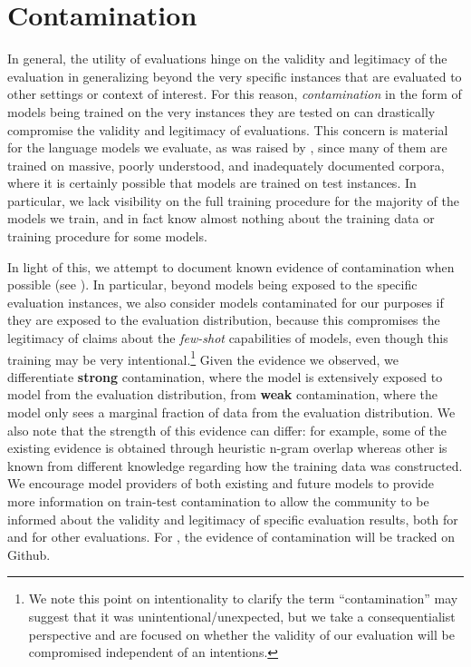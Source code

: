 \hypertarget{contamination}{\section{Contamination}}
\label{app:contamination}

In general, the utility of evaluations hinge on the validity and legitimacy of the evaluation in generalizing beyond the very specific instances that are evaluated to other settings or context of interest.
For this reason, \textit{contamination} in the form of models being trained on the very instances they are tested on can drastically compromise the validity and legitimacy of evaluations.
This concern is material for the language models we evaluate, as was raised by \citet{brown2020gpt3}, since many of them are trained on massive, poorly understood, and inadequately documented corpora, where it is certainly possible that models are trained on test instances.
In particular, we lack visibility on the full training procedure for the majority of the models we train, and in fact know almost nothing about the training data or training procedure for some models.


In light of this, we attempt to document known evidence of contamination when possible (see ).
In particular, beyond models being exposed to the specific evaluation instances, we also consider models contaminated for our purposes if they are exposed to the evaluation distribution, because this compromises the legitimacy of claims about the \textit{few-shot} capabilities of models, even though this training may be very intentional.\footnote{We note this point on intentionality to clarify the term ``contamination'' may suggest that it was unintentional/unexpected, but we take a consequentialist perspective and are focused on whether the validity of our evaluation will be compromised independent of an intentions.}
Given the evidence we observed, we differentiate \textbf{strong} contamination, where the model is extensively exposed to model from the evaluation distribution, from \textbf{weak} contamination, where the model only sees a marginal fraction of data from the evaluation distribution.
We also note that the strength of this evidence can differ: for example, some of the existing evidence is obtained through heuristic n-gram overlap whereas other is known from different knowledge regarding how the training data was constructed.
We encourage model providers of both existing and future models to provide more information on train-test contamination to allow the community to be informed about the validity and legitimacy of specific evaluation results, both for \benchmarkname and for other evaluations.
For \benchmarkname, the evidence of contamination will be tracked on Github.